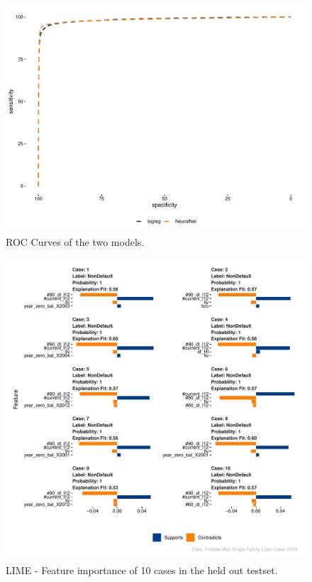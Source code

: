 \begin{figure}[H]
    \centering
    \includegraphics[width = \textwidth]{Figures/p_roc.pdf}
    \caption{ROC Curves of the two models.}
    \label{fig:p_roc}
\end{figure}


\begin{figure}[H]
    \centering
    \includegraphics[width = \textwidth]{Figures/p_lime_features_ANN.pdf}
    \caption{LIME - Feature importance of 10 cases in the held out testset.}
    \label{fig:LIME_Features}
\end{figure}

